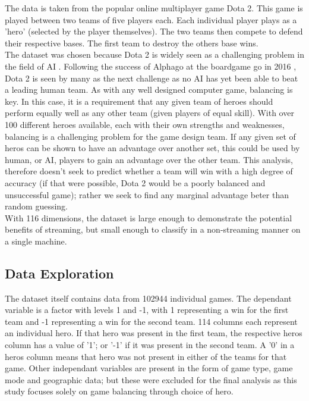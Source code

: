 \documentclass[10pt]{article}
\begin{document}
The data is taken from the popular online multiplayer game Dota 2. This game is played between two teams of five players each. Each individual player plays as a 'hero' (selected by the player themselves). The two teams then compete to defend their respective bases. The first team to destroy the others base wins.\\

The dataset was chosen because Dota 2 is widely seen as a challenging problem in the field of AI \cite{7828640}. Following the success of Alphago at the boardgame go in 2016 \cite{8295075}, Dota 2 is seen by many as the next challenge as no AI has yet been able to beat a leading human team. As with any well designed computer game, balancing is key. In this case, it is a requirement that any given team of heroes should perform equally well as any other team (given players of equal skill). With over 100 different heroes available, each with their own strengths and weaknesses, balancing is a challenging problem for the game design team. If any given set of heros can be shown to have an advantage over another set, this could be used by human, or AI, players to gain an advantage over the other team. This analysis, therefore doesn't seek to predict whether a team will win with a high degree of accuracy (if that were possible, Dota 2 would be a poorly balanced and unsuccessful game); rather we seek to find any marginal advantage beter than random guessing.\\


With 116 dimensions, the dataset is large enough to demonstrate the potential benefits of streaming, but small enough to classify in a non-streaming manner on a single machine. 

\subsection{Data Exploration}

The dataset itself contains data from 102944 individual games. The dependant variable is a factor with levels 1 and -1, with 1 representing a win for the first team and -1 representing a win for the second team. 114 columns each represent an individual hero. If that hero was present in the first team, the respective heros column has a value of '1'; or '-1' if it was present in the second team. A '0' in a heros column means that hero was not present in either of the teams for that game.
Other independant variables are present in the form of game type, game mode and geographic data; but these were excluded for the final analysis as this study focuses solely on game balancing through choice of hero.\\
\end{document}
